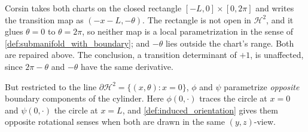 \begin{ainote}
Corsin takes both charts on the closed rectangle $[-L,0]\times[0,2\pi]$ and writes the transition
map as $(-x-L,-\theta)$. The rectangle is not open in $\mathcal{H}^2$, and it glues
$\theta = 0$ to $\theta = 2\pi$, so neither map is a local parametrization in the sense of
\cref{def:submanifold_with_boundary}; and $-\theta$ lies outside the chart's range. Both are
repaired above. The conclusion, a transition determinant of $+1$, is unaffected, since
$2\pi-\theta$ and $-\theta$ have the same derivative.
\end{ainote}

But restricted to the line $\partial\mathcal{H}^2 = \{(x,\theta) : x=0\}$, $\phi$ and $\psi$
parametrize \emph{opposite} boundary components of the cylinder. Here $\phi(0,\cdot)$ traces the
circle at $x=0$ and $\psi(0,\cdot)$ the circle at $x=L$, and \cref{def:induced_orientation}
gives them opposite rotational senses when both are drawn in the same $(y,z)$-view.

